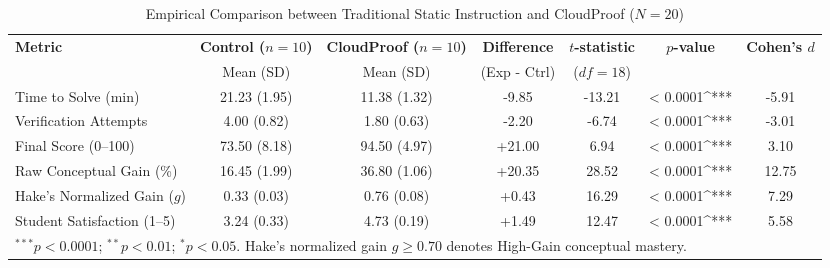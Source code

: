 \begin{table}[t]
\centering
\caption{Empirical Comparison between Traditional Static Instruction and CloudProof ($N=20$)}
\label{tab:empirical_results}
\begin{tabular}{lcccccc}
\toprule
\textbf{Metric} & \textbf{Control ($n=10$)} & \textbf{CloudProof ($n=10$)} & \textbf{Difference} & \textbf{$t$-statistic} & \textbf{$p$-value} & \textbf{Cohen's $d$} \\
 & Mean (SD) & Mean (SD) & (Exp - Ctrl) & ($df=18$) & & \\
\midrule
Time to Solve (min) & 21.23 (1.95) & 11.38 (1.32) & -9.85 & -13.21 & < 0.0001^{***} & -5.91 \\
Verification Attempts & 4.00 (0.82) & 1.80 (0.63) & -2.20 & -6.74 & < 0.0001^{***} & -3.01 \\
Final Score (0--100) & 73.50 (8.18) & 94.50 (4.97) & +21.00 & 6.94 & < 0.0001^{***} & 3.10 \\
Raw Conceptual Gain (\%) & 16.45 (1.99) & 36.80 (1.06) & +20.35 & 28.52 & < 0.0001^{***} & 12.75 \\
Hake's Normalized Gain ($g$) & 0.33 (0.03) & 0.76 (0.08) & +0.43 & 16.29 & < 0.0001^{***} & 7.29 \\
Student Satisfaction (1--5) & 3.24 (0.33) & 4.73 (0.19) & +1.49 & 12.47 & < 0.0001^{***} & 5.58 \\
\bottomrule
\multicolumn{7}{l}{\footnotesize $^{***}p < 0.0001$; $^{**}p < 0.01$; $^{*}p < 0.05$. Hake's normalized gain $g \ge 0.70$ denotes High-Gain conceptual mastery.} \\
\end{tabular}
\end{table}
